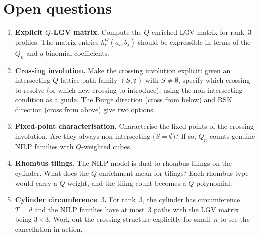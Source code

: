 \documentclass[11pt]{article}
\theoremstyle{plain}
\theoremstyle{definition}
\begin{document}
\section{Open questions}
\label{sec:open}

\begin{enumerate}
  \item \textbf{Explicit $Q$-LGV matrix.}\;
    Compute the $Q$-enriched LGV matrix for rank~$3$
    profiles.  The matrix entries $h_c^Q(a_i, b_j)$
    should be expressible in terms of the $Q_n$ and
    $q$-binomial coefficients.

  \item \textbf{Crossing involution.}\;
    Make the crossing involution explicit: given an
    intersecting $Q$-lattice path family
    $(S, \mathfrak{p})$ with $S \neq \emptyset$, specify
    which crossing to resolve (or which new crossing to
    introduce), using the non-intersecting condition as a
    guide.  The Burge direction (cross from below) and
    RSK direction (cross from above) give two options.

  \item \textbf{Fixed-point characterisation.}\;
    Characterise the fixed points of the crossing
    involution.  Are they always non-intersecting
    ($S = \emptyset$)?  If so, $Q_n$ counts genuine NILP
    families with $Q$-weighted cubes.

  \item \textbf{Rhombus tilings.}\;
    The NILP model is dual to rhombus tilings on the
    cylinder.  What does the $Q$-enrichment mean for
    tilings?  Each rhombus type would carry a $Q$-weight,
    and the tiling count becomes a $Q$-polynomial.

  \item \textbf{Cylinder circumference~$3$.}\;
    For rank~$3$, the cylinder has circumference~$T = d$
    and the NILP families have at most~$3$ paths with
    the LGV matrix being $3 \times 3$.  Work out the
    crossing structure explicitly for small~$n$ to see
    the cancellation in action.
\end{enumerate}
\end{document}
